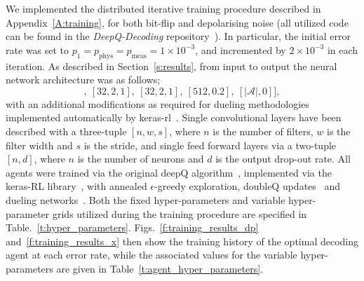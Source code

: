 \documentclass[twocolumn,preprintnumbers,amsmath,amssymb,notitlepage,nofootinbib,longbibliography,superscriptaddress,aps,pra,10pt]{revtex4-1}
\begin{document}
	We implemented the distributed iterative training procedure described in Appendix~\ref{A:training}, for both bit-flip and depolarising noise (all utilized code can be found in the \emph{DeepQ-Decoding} repository~\cite{DeepQDecoding}).
	In particular, the initial error rate was set to $p_1 = p_{\mathrm{phys}} = p_{\mathrm{meas}} = 1\times10^{-3}$, and incremented by $2\times10^{-3}$ in each iteration.
	As described in Section~\ref{s:results}, from input to output the neural network architecture was as follows;
	\begin{equation}
		[[64,3,2],~[32,2,1],~[32,2,1],~[512,0.2],~[|\mathcal{A}|, 0]],
	\end{equation}
	with an additional modifications as required for dueling methodologies~\cite{RLwang2015dueling} implemented automatically by keras-rl~\cite{plappert2016kerasrl}.
	Single convolutional layers have been described with a three-tuple $[n,w,s]$, where $n$ is the number of filters, $w$ is the filter width and $s$ is the stride, and single feed forward layers via a two-tuple $[n,d]$, where $n$ is the number of neurons and $d$ is the output drop-out rate.
	All agents were trained via the original deepQ algorithm~\cite{RLMnih15}, implemented via the keras-RL library~\cite{plappert2016kerasrl}, with annealed $\epsilon$-greedy exploration, doubleQ updates~\cite{RLvan2016deep} and dueling networks~\cite{RLvan2016deep}.
	Both the fixed hyper-parameters and variable hyper-parameter grids utilized during the training procedure are specified in Table.~\ref{t:hyper_parameters}.
	Figs.~\ref{f:training_results_dp} and~\ref{f:training_results_x} then show the training history of the optimal decoding agent at each error rate, while the associated values for the variable hyper-parameters are given in Table~\ref{t:agent_hyper_parameters}.
\end{document}
